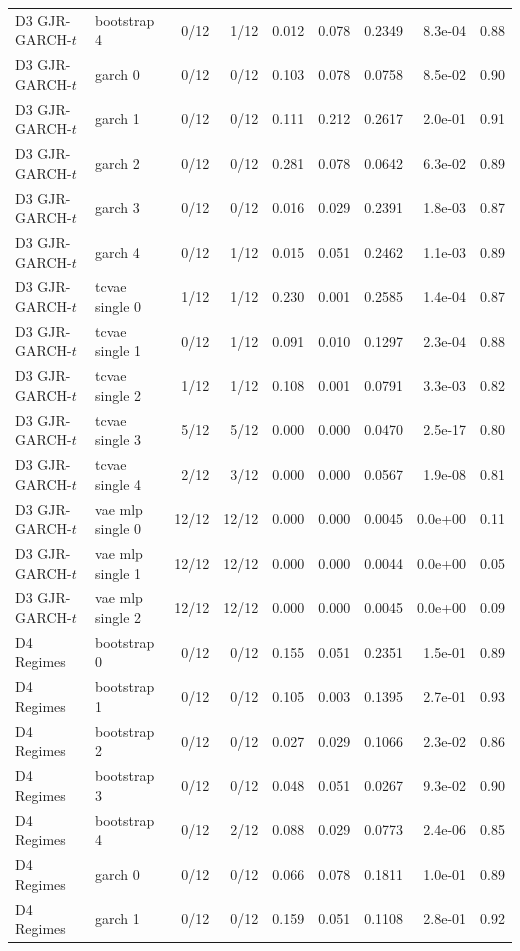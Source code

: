 \begin{tabular}{llrrrrrrr}
D3 GJR-GARCH-$t$ & bootstrap 4 & 0/12 & 1/12 & 0.012 & 0.078 & 0.2349 & 8.3e-04 & 0.88 \\
D3 GJR-GARCH-$t$ & garch 0 & 0/12 & 0/12 & 0.103 & 0.078 & 0.0758 & 8.5e-02 & 0.90 \\
D3 GJR-GARCH-$t$ & garch 1 & 0/12 & 0/12 & 0.111 & 0.212 & 0.2617 & 2.0e-01 & 0.91 \\
D3 GJR-GARCH-$t$ & garch 2 & 0/12 & 0/12 & 0.281 & 0.078 & 0.0642 & 6.3e-02 & 0.89 \\
D3 GJR-GARCH-$t$ & garch 3 & 0/12 & 0/12 & 0.016 & 0.029 & 0.2391 & 1.8e-03 & 0.87 \\
D3 GJR-GARCH-$t$ & garch 4 & 0/12 & 1/12 & 0.015 & 0.051 & 0.2462 & 1.1e-03 & 0.89 \\
D3 GJR-GARCH-$t$ & tcvae single 0 & 1/12 & 1/12 & 0.230 & 0.001 & 0.2585 & 1.4e-04 & 0.87 \\
D3 GJR-GARCH-$t$ & tcvae single 1 & 0/12 & 1/12 & 0.091 & 0.010 & 0.1297 & 2.3e-04 & 0.88 \\
D3 GJR-GARCH-$t$ & tcvae single 2 & 1/12 & 1/12 & 0.108 & 0.001 & 0.0791 & 3.3e-03 & 0.82 \\
D3 GJR-GARCH-$t$ & tcvae single 3 & 5/12 & 5/12 & 0.000 & 0.000 & 0.0470 & 2.5e-17 & 0.80 \\
D3 GJR-GARCH-$t$ & tcvae single 4 & 2/12 & 3/12 & 0.000 & 0.000 & 0.0567 & 1.9e-08 & 0.81 \\
D3 GJR-GARCH-$t$ & vae mlp single 0 & 12/12 & 12/12 & 0.000 & 0.000 & 0.0045 & 0.0e+00 & 0.11 \\
D3 GJR-GARCH-$t$ & vae mlp single 1 & 12/12 & 12/12 & 0.000 & 0.000 & 0.0044 & 0.0e+00 & 0.05 \\
D3 GJR-GARCH-$t$ & vae mlp single 2 & 12/12 & 12/12 & 0.000 & 0.000 & 0.0045 & 0.0e+00 & 0.09 \\
D4 Regimes & bootstrap 0 & 0/12 & 0/12 & 0.155 & 0.051 & 0.2351 & 1.5e-01 & 0.89 \\
D4 Regimes & bootstrap 1 & 0/12 & 0/12 & 0.105 & 0.003 & 0.1395 & 2.7e-01 & 0.93 \\
D4 Regimes & bootstrap 2 & 0/12 & 0/12 & 0.027 & 0.029 & 0.1066 & 2.3e-02 & 0.86 \\
D4 Regimes & bootstrap 3 & 0/12 & 0/12 & 0.048 & 0.051 & 0.0267 & 9.3e-02 & 0.90 \\
D4 Regimes & bootstrap 4 & 0/12 & 2/12 & 0.088 & 0.029 & 0.0773 & 2.4e-06 & 0.85 \\
D4 Regimes & garch 0 & 0/12 & 0/12 & 0.066 & 0.078 & 0.1811 & 1.0e-01 & 0.89 \\
D4 Regimes & garch 1 & 0/12 & 0/12 & 0.159 & 0.051 & 0.1108 & 2.8e-01 & 0.92 \\

\end{tabular}
